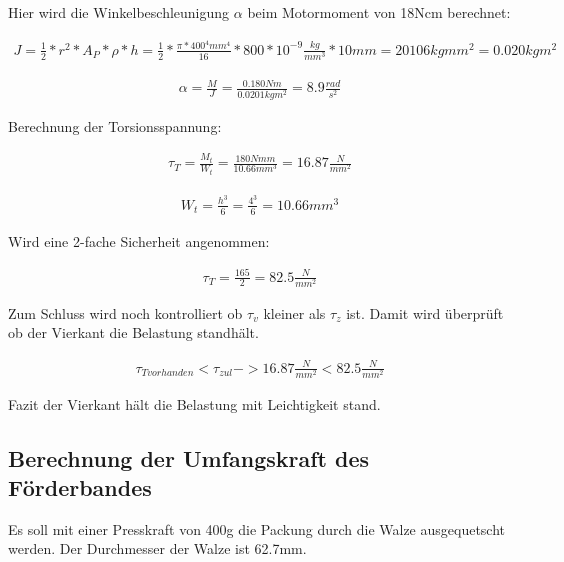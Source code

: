 Hier wird die Winkelbeschleunigung $\alpha$ beim Motormoment von 18Ncm berechnet:

\begin{align*}
J = \frac{1}{2}*r^{2}*A_{ P }*\rho*h=\frac{1}{2}*\frac{ \pi*400^{4}mm^{4} }{16}*800*10^{-9}\frac{ kg }{ mm^{3} }*10mm= 20106kg mm^{2} = 0.020kg m^{2}
\end{align*}

\begin{align*}
\alpha = \frac{ M }{ J }=\frac{ 0.180Nm }{ 0.0201kgm^{2} } = 8.9 \frac{ rad }{ s^{2} }
\end{align*}

Berechnung der Torsionsspannung:

\begin{align*}
\tau_{ T } = \frac{ M_{ t } }{W_{ t } } = \frac{ 180 Nmm }{ 10.66 mm^{3} } = 16.87\frac{ N }{mm^{2}}
\end{align*}

\begin{align*}
W_t = \frac{h^{3}}{6} = \frac{4^{3}}{6} = 10.66mm^{3}
\end{align*}

Wird eine 2-fache Sicherheit angenommen:

\begin{align*}
\tau_T=\frac{165}{2}=82.5\frac{N}{mm^{2}}
\end{align*}

Zum Schluss wird noch kontrolliert ob $\tau_v$ kleiner als $\tau_z$ ist.
Damit wird überprüft ob der Vierkant die Belastung standhält.

\begin{align*}
\tau_{T vorhanden} < \tau_{zul}  ->  16.87 \frac{N}{mm^{2}} < 82.5\frac{N}{mm^{2}}
\end{align*}

Fazit der Vierkant hält die Belastung mit Leichtigkeit stand.

\subsection{Berechnung der Umfangskraft des Förderbandes}

Es soll mit einer Presskraft von 400g die Packung durch die Walze ausgequetscht werden. Der Durchmesser der Walze ist 62.7mm.


